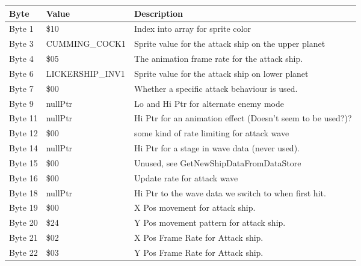 \begin{figure}[H]
{\begin{adjustbox}{width=12cm}
\begin{tabular}{lll}
\toprule
 Byte    & Value                    & Description                                                        \\
\midrule
 Byte 1  & \$10                      & Index into array for sprite color                                  \\
 Byte 3  & CUMMING\_COCK1            & Sprite value for the attack ship on the upper planet               \\
 Byte 4  & \$05                      & The animation frame rate for the attack ship.                      \\
 Byte 6  & LICKERSHIP\_INV1          & Sprite value for the attack ship on lower planet                   \\
 Byte 7  & \$00                      & Whether a specific attack behaviour is used.                       \\
 Byte 9  & nullPtr                  & Lo and Hi Ptr for alternate enemy mode                             \\
 Byte 11 & nullPtr                  & Hi Ptr for an animation effect (Doesn't seem to be used?)?         \\
 Byte 12 & \$00                      & some kind of rate limiting for attack wave                         \\
 Byte 14 & nullPtr                  & Hi Ptr for a stage in wave data (never used).                      \\
 Byte 15 & \$00                      & Unused, see GetNewShipDataFromDataStore                            \\
 Byte 16 & \$00                      & Update rate for attack wave                                        \\
 Byte 18 & nullPtr                  & Hi Ptr to the wave data we switch to when first hit.               \\
 Byte 19 & \$00                      & X Pos movement for attack ship.                                    \\
 Byte 20 & \$24                      & Y Pos movement pattern for attack ship.                            \\
 Byte 21 & \$02                      & X Pos Frame Rate for Attack ship.                                  \\
 Byte 22 & \$03                      & Y Pos Frame Rate for Attack ship.                                  \\

\end{tabular}
\end{adjustbox}}
\end{figure}
